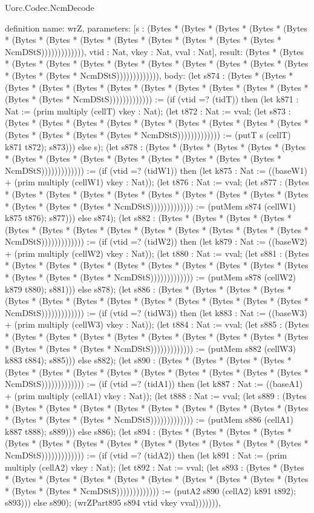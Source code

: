 \begin{lexlean}{Uorc.Codec.NcmDecode}
\begin{semanticmodule}
definition{
  name: wrZ,
  parameters: [s : (Bytes * (Bytes * (Bytes * (Bytes * (Bytes * (Bytes * (Bytes * (Bytes * (Bytes * (Bytes * (Bytes * (Bytes * (Bytes * NcmDStS))))))))))))), vtid : Nat, vkey : Nat, vval : Nat],
  result: (Bytes * (Bytes * (Bytes * (Bytes * (Bytes * (Bytes * (Bytes * (Bytes * (Bytes * (Bytes * (Bytes * (Bytes * (Bytes * NcmDStS))))))))))))),
  body: (let s874 : (Bytes * (Bytes * (Bytes * (Bytes * (Bytes * (Bytes * (Bytes * (Bytes * (Bytes * (Bytes * (Bytes * (Bytes * (Bytes * NcmDStS))))))))))))) := (if (vtid =? (tidT)) then (let k871 : Nat := (prim multiply (cellT) vkey : Nat); (let t872 : Nat := vval; (let s873 : (Bytes * (Bytes * (Bytes * (Bytes * (Bytes * (Bytes * (Bytes * (Bytes * (Bytes * (Bytes * (Bytes * (Bytes * (Bytes * NcmDStS))))))))))))) := (putT s (cellT) k871 t872); s873))) else s); (let s878 : (Bytes * (Bytes * (Bytes * (Bytes * (Bytes * (Bytes * (Bytes * (Bytes * (Bytes * (Bytes * (Bytes * (Bytes * (Bytes * NcmDStS))))))))))))) := (if (vtid =? (tidW1)) then (let k875 : Nat := ((baseW1) + (prim multiply (cellW1) vkey : Nat)); (let t876 : Nat := vval; (let s877 : (Bytes * (Bytes * (Bytes * (Bytes * (Bytes * (Bytes * (Bytes * (Bytes * (Bytes * (Bytes * (Bytes * (Bytes * (Bytes * NcmDStS))))))))))))) := (putMem s874 (cellW1) k875 t876); s877))) else s874); (let s882 : (Bytes * (Bytes * (Bytes * (Bytes * (Bytes * (Bytes * (Bytes * (Bytes * (Bytes * (Bytes * (Bytes * (Bytes * (Bytes * NcmDStS))))))))))))) := (if (vtid =? (tidW2)) then (let k879 : Nat := ((baseW2) + (prim multiply (cellW2) vkey : Nat)); (let t880 : Nat := vval; (let s881 : (Bytes * (Bytes * (Bytes * (Bytes * (Bytes * (Bytes * (Bytes * (Bytes * (Bytes * (Bytes * (Bytes * (Bytes * (Bytes * NcmDStS))))))))))))) := (putMem s878 (cellW2) k879 t880); s881))) else s878); (let s886 : (Bytes * (Bytes * (Bytes * (Bytes * (Bytes * (Bytes * (Bytes * (Bytes * (Bytes * (Bytes * (Bytes * (Bytes * (Bytes * NcmDStS))))))))))))) := (if (vtid =? (tidW3)) then (let k883 : Nat := ((baseW3) + (prim multiply (cellW3) vkey : Nat)); (let t884 : Nat := vval; (let s885 : (Bytes * (Bytes * (Bytes * (Bytes * (Bytes * (Bytes * (Bytes * (Bytes * (Bytes * (Bytes * (Bytes * (Bytes * (Bytes * NcmDStS))))))))))))) := (putMem s882 (cellW3) k883 t884); s885))) else s882); (let s890 : (Bytes * (Bytes * (Bytes * (Bytes * (Bytes * (Bytes * (Bytes * (Bytes * (Bytes * (Bytes * (Bytes * (Bytes * (Bytes * NcmDStS))))))))))))) := (if (vtid =? (tidA1)) then (let k887 : Nat := ((baseA1) + (prim multiply (cellA1) vkey : Nat)); (let t888 : Nat := vval; (let s889 : (Bytes * (Bytes * (Bytes * (Bytes * (Bytes * (Bytes * (Bytes * (Bytes * (Bytes * (Bytes * (Bytes * (Bytes * (Bytes * NcmDStS))))))))))))) := (putMem s886 (cellA1) k887 t888); s889))) else s886); (let s894 : (Bytes * (Bytes * (Bytes * (Bytes * (Bytes * (Bytes * (Bytes * (Bytes * (Bytes * (Bytes * (Bytes * (Bytes * (Bytes * NcmDStS))))))))))))) := (if (vtid =? (tidA2)) then (let k891 : Nat := (prim multiply (cellA2) vkey : Nat); (let t892 : Nat := vval; (let s893 : (Bytes * (Bytes * (Bytes * (Bytes * (Bytes * (Bytes * (Bytes * (Bytes * (Bytes * (Bytes * (Bytes * (Bytes * (Bytes * NcmDStS))))))))))))) := (putA2 s890 (cellA2) k891 t892); s893))) else s890); (wrZPart895 s894 vtid vkey vval))))))),
}
\end{semanticmodule}
\end{lexlean}
